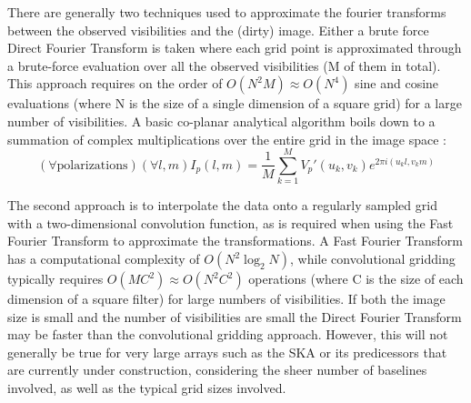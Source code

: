  There are generally two techniques used to approximate the fourier transforms between the observed visibilities and the (dirty) image. Either a brute force Direct Fourier Transform is taken where each grid point is approximated through a brute-force
 evaluation over all the observed visibilities (M of them in total). This approach requires on the order of $O(N^2M) \approx O(N^4)$ sine and cosine evaluations (where N is the size of a single dimension of a square grid) for a large number of visibilities. A basic co-planar analytical 
 algorithm boils down to a summation of complex multiplications over the entire grid in the image space \cite[Lecture 7]{taylor1999synthesis}: 
 \begin{equation}
  (\forall \text{polarizations})(\forall l,m) I_{p}(l,m) = \frac{1}{M}\sum_{k=1}^{M}{V_p'(u_k,v_k)e^{2\pi i (u_kl,v_km)}}
 \end{equation}
 
 The second approach is to interpolate the data onto a regularly sampled grid with a two-dimensional convolution function, as is required when using the Fast Fourier Transform to approximate the transformations. A Fast Fourier Transform has a computational complexity of $O(N^2\log_2{N})$, while
 convolutional gridding typically requires $O(MC^2) \approx O(N^2C^2)$ operations (where C is the size of each dimension of a square filter) for large numbers of visibilities. If both the image size is small and the number of visibilities 
 are small the Direct Fourier Transform may be faster than the convolutional gridding approach. However, this will not generally be true for very large arrays such as the SKA or its predicessors that are currently under construction, 
 considering the sheer number of baselines involved, as well as the typical grid sizes involved.
 
